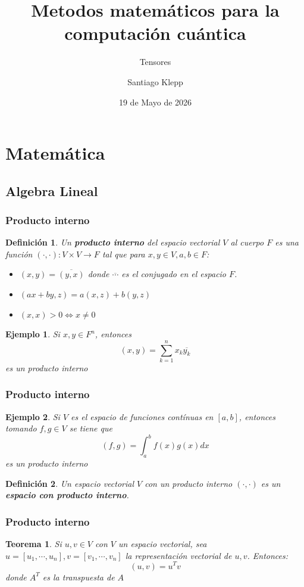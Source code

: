 \documentclass{beamer}
\title{Metodos matemáticos para la computación cuántica}
\subtitle{Tensores}
\author{Santiago Klepp}
\date{19 de Mayo de 2026}
\newtheorem{teo}{Teorema}
\newtheorem{defi}{Definición}
\newtheorem{ejemplo}{Ejemplo}
\begin{document}
\frame{\titlepage}
\section{Matemática}
\subsection{Algebra Lineal}
\begin{frame}
\frametitle{Producto interno}
\begin{defi}
Un \textbf{producto interno} del espacio vectorial $V$ al cuerpo $F$
    es una función  $( \cdot,\cdot ) : V \times V \to F$ tal que
para $x,y \in V, a,b \in F$:
\begin{itemize}
    \item $( x,y ) = \overline{( y,x )}$ donde $\overline{\cdots}$ es el conjugado en el espacio $F$.
    \item $( ax + by,z ) = a ( x,z ) + b ( y,z )$
    \item $( x,x ) > 0 \iff x \neq 0$
\end{itemize}
\end{defi}
\pause
\begin{ejemplo}
Si $x, y \in F^n$, entonces
$$
    ( x,y ) = \sum_{k=1}^n x_k\overline{y_k}
$$
es un producto interno
\end{ejemplo}
\end{frame}
\begin{frame}
\frametitle{Producto interno}
\begin{ejemplo}
Si $V$ es el espacio de funciones contínuas en $[a,b]$, entonces
tomando $f,g \in V$ se tiene que 
$$
    ( f,g ) = \int_a^b f(x) g(x) dx 
$$
es un producto interno
\end{ejemplo}
\pause
\begin{defi}
    Un espacio vectorial $V$ con un producto interno $( \cdot,\cdot )$ es un \textbf{espacio con producto interno}.
\end{defi}
\end{frame}
\begin{frame}
    \frametitle{Producto interno}
    \begin{teo}
        Si $u, v \in V$ con $V$ un espacio vectorial, sea $u = [u_1,\cdots,u_n], v = [v_1,\cdots, v_n]$ la representación
        vectorial de $u,v$. Entonces:
        $$
        (u,v) = u^T v
        $$
        donde $A^T$ es la transpuesta de $A$
    \end{teo}
\end{frame}
\end{document}
